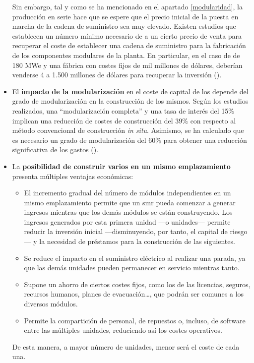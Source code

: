 \begin{itemize}
  Sin embargo, tal y como se ha mencionado en el apartado \ref{modularidad}, la producción en serie hace que se espere que el precio inicial de la puesta en marcha de la cadena de suministro sea muy elevado. Existen estudios que establecen un número mínimo necesario de  a un cierto precio de venta para recuperar el coste de establecer una cadena de suministro para la fabricación de los componentes modulares de la planta. En particular, en el caso de  de 180 MWe y una fábrica con costes fijos de mil millones de dólares, deberían venderse 4  a 1.500 millones de dólares para recuperar la inversión (\cite{overview_smrs}).

  \item El \textbf{impacto de la modularización} en el coste de capital de los  depende del grado de modularización en la construcción de los mismos. Según los estudios realizados, una ``modularización completa'' y una tasa de interés del 15\% implican una reducción de costes de construcción del 39\% con respecto al método convencional de construcción \emph{in situ}. Asimismo, se ha calculado que es necesario un grado de modularización del 60\% para obtener una reducción significativa de los gastos (\cite{maronati2016total}).
  
  \item La \textbf{posibilidad de construir varios  en un mismo emplazamiento} presenta múltiples ventajas económicas:
  
  \begin{itemize}
    \item El incremento gradual del número de módulos independientes en un mismo emplazamiento permite que un \acrshort{smr} pueda comenzar a generar ingresos mientras que los demás módulos se están construyendo. Los ingresos generados por esta primera unidad ---o unidades--- permite reducir la inversión inicial ---disminuyendo, por tanto, el capital de riesgo--- y la necesidad de préstamos para la construcción de las siguientes.
    \item Se reduce el impacto en el suministro eléctrico al realizar una parada, ya que las demás unidades pueden permanecer en servicio mientras tanto.
    \item Supone un ahorro de ciertos costes fijos, como los de las licencias, seguros, recursos humanos, planes de evacuación\dots, que podrán ser comunes a los diversos módulos.
    \item Permite la compartición de personal, de repuestos o, incluso, de software entre las múltiples unidades, reduciendo así los costes operativos.
  \end{itemize}
  De esta manera, a mayor número de unidades, menor será el coste de cada una.


\end{itemize}
